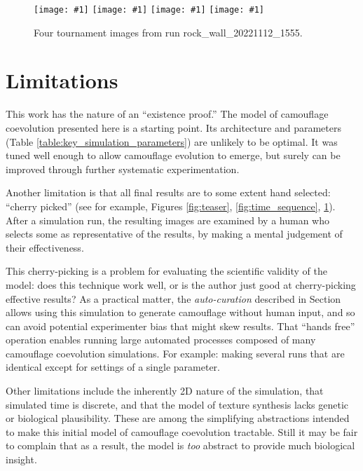 \documentclass[letterpaper]{article}
\newcommand{\jargon}[1]{\textit{#1}}
\newcommand{\runID}{\footnotesize}
\newcommand{\igfour}[1]{\texttt{[image: \#1]}}
\begin{document}
\begin{figure}
    \igfour{20221112_1555_step_6495.png}
    \hfill
    \igfour{20221112_1555_step_5510.png}
    \hfill
    \igfour{20221112_1555_step_5681.png}
    \hfill
    \igfour{20221112_1555_step_6370.png}
    \caption{Four tournament images from run {\runID rock\_wall\_20221112\_1555}.}
    \label{fig:rock_wall_4x}
\end{figure}


\section{Limitations}
\label{subsec:limitations}
This work has the nature of an “existence proof.” The model of camouflage coevolution presented here is a starting point. Its architecture and parameters (Table \ref{table:key_simulation_parameters}) are unlikely to be optimal. It was tuned well enough to allow camouflage evolution to emerge, but surely can be improved through further systematic experimentation.
\par
Another limitation is that all final results are to some extent hand selected: “cherry picked” (see for example, Figures \ref{fig:teaser}, \ref{fig:time_sequence}, \ref{fig:rock_wall_4x}). After a simulation run, the resulting images are examined by a human who selects some as representative of the results, by making a mental judgement of their effectiveness.
\par
This cherry-picking is a problem for evaluating the scientific validity of the model: does this technique work well, or is the author just good at cherry-picking effective results? As a practical matter, the \jargon{auto-curation} described in Section  allows using this simulation to generate camouflage without human input, and so can avoid potential experimenter bias that might skew results. That “hands free” operation enables running large automated processes composed of many camouflage coevolution simulations. For example: making several runs that are identical except for settings of a single parameter.
\par
Other limitations include the inherently 2D nature of the simulation, that simulated time is discrete, and that the model of texture synthesis lacks genetic or biological plausibility. These are among the simplifying abstractions intended to make this initial model of camouflage coevolution tractable. Still it may be fair to complain that as a result, the model is \textit{too} abstract to provide much biological insight.
\par
\end{document}
